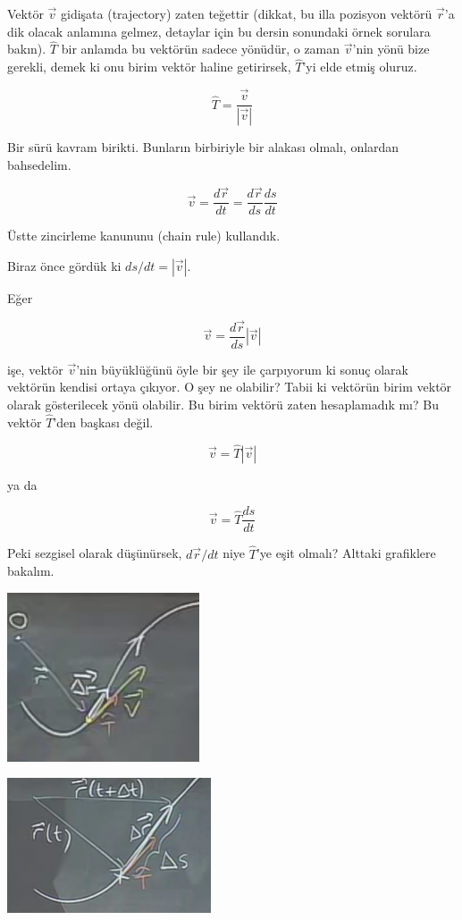 \documentclass[12pt,fleqn]{article}\usepackage{../../common}
\begin{document}
Vektör $\vec{v}$ gidişata (trajectory) zaten teğettir (dikkat, bu illa pozisyon
vektörü $\vec{r}$'a dik olacak anlamına gelmez, detaylar için bu dersin
sonundaki örnek sorulara bakın). $\hat{T}$ bir anlamda bu vektörün sadece
yönüdür, o zaman $\vec{v}$'nin yönü bize gerekli, demek ki onu birim vektör
haline getirirsek, $\hat{T}$'yi elde etmiş oluruz.

$$ \hat{T} = \frac{\vec{v}}{|\vec{v}|} $$

Bir sürü kavram birikti. Bunların birbiriyle bir alakası olmalı, onlardan
bahsedelim. 

$$ \vec{v} = \frac{d\vec{r}}{dt} = \frac{d\vec{r}}{ds}\frac{ds}{dt} $$

Üstte zincirleme kanununu (chain rule) kullandık. 

Biraz önce gördük ki $ds/dt = |\vec{v}|$. 

Eğer 

$$ \vec{v} = \frac{d\vec{r}}{ds}|\vec{v}| $$

işe, vektör $\vec{v}$'nin büyüklüğünü öyle bir şey ile çarpıyorum ki sonuç
olarak vektörün kendisi ortaya çıkıyor. O şey ne olabilir? Tabii ki
vektörün birim vektör olarak gösterilecek yönü olabilir. Bu birim vektörü
zaten hesaplamadık mı? Bu vektör $\hat{T}$'den başkası değil.

$$ \vec{v} = \hat{T}|\vec{v}| $$

ya da

$$ \vec{v} = \hat{T}\frac{ds}{dt} $$

Peki sezgisel olarak düşünürsek, $d\vec{r}/dt$ niye $\hat{T}$'ye eşit olmalı?
Alttaki grafiklere bakalım.

\includegraphics[height=5cm]{6_4.png}

\includegraphics[height=4cm]{6_5.png}
\end{document}
